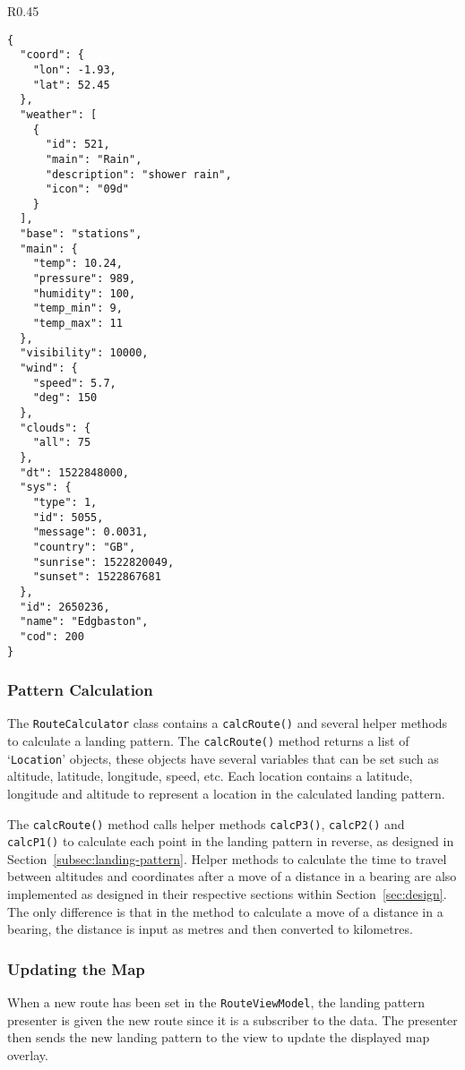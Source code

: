 \begin{wrapfigure}{R}{0.45\textwidth}
  \begin{verbatim}
{
  "coord": {
    "lon": -1.93,
    "lat": 52.45
  },
  "weather": [
    {
      "id": 521,
      "main": "Rain",
      "description": "shower rain",
      "icon": "09d"
    }
  ],
  "base": "stations",
  "main": {
    "temp": 10.24,
    "pressure": 989,
    "humidity": 100,
    "temp_min": 9,
    "temp_max": 11
  },
  "visibility": 10000,
  "wind": {
    "speed": 5.7,
    "deg": 150
  },
  "clouds": {
    "all": 75
  },
  "dt": 1522848000,
  "sys": {
    "type": 1,
    "id": 5055,
    "message": 0.0031,
    "country": "GB",
    "sunrise": 1522820049,
    "sunset": 1522867681
  },
  "id": 2650236,
  "name": "Edgbaston",
  "cod": 200
}
  \end{verbatim}
  \label{lst:json-response}
\end{wrapfigure}

\subsubsection{Pattern Calculation}\label{subsubsec:pattern-calculation}
The \texttt{RouteCalculator} class contains a \texttt{calcRoute()} and several helper methods to calculate a landing pattern. The \texttt{calcRoute()} method returns a list of `\texttt{Location}' objects, these objects have several variables that can be set such as altitude, latitude, longitude, speed, etc. Each location contains a latitude, longitude and altitude to represent a location in the calculated landing pattern.

The \texttt{calcRoute()} method calls helper methods \texttt{calcP3()}, \texttt{calcP2()} and \texttt{calcP1()} to calculate each point in the landing pattern in reverse, as designed in Section~\ref{subsec:landing-pattern}. Helper methods to calculate the time to travel between altitudes and coordinates after a move of a distance in a bearing are also implemented as designed in their respective sections within Section~\ref{sec:design}. The only difference is that in the method to calculate a move of a distance in a bearing, the distance is input as metres and then converted to kilometres.

\subsubsection{Updating the Map}
When a new route has been set in the \texttt{RouteViewModel}, the landing pattern presenter is given the new route since it is a subscriber to the data. The presenter then sends the new landing pattern to the view to update the displayed map overlay.

